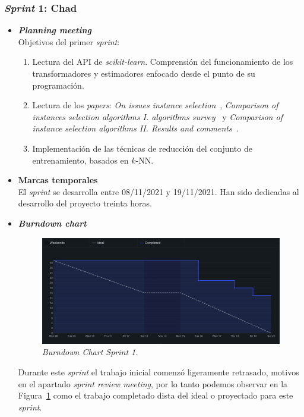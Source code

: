\subsubsection{\textit{Sprint} 1: Chad}
\begin{itemize}
\item \textbf{\textit{Planning meeting}}\\
Objetivos del primer \textit{sprint}:
\begin{enumerate}
\item Lectura del API de \textit{scikit-learn}. Comprensión del funcionamiento de los transformadores y estimadores enfocado desde el punto de su programación.
\item Lectura de los \textit{papers}: \textit{On issues instance selection}~\cite{liu2002issues}, \textit{Comparison of instances selection algorithms I. algorithms survey}~\cite{jankowski2004comparison} y \textit{Comparison of instance selection algorithms II. Results and comments}~\cite{grochowski2004comparison}.
\item Implementación de las técnicas de reducción del conjunto de entrenamiento, basados en $k$-NN.
\end{enumerate}

\item \textbf{Marcas temporales}\\
El \textit{sprint} se desarrolla entre 08/11/2021 y 19/11/2021. Han sido dedicadas al desarrollo del proyecto treinta horas.

\item \textbf{\textit{Burndown chart}}\\
\begin{figure}
\begin{center}
\includegraphics[width=\textwidth]{../img/anexos/sprints/BD-Sprint1}
\caption{\textit{Burndown Chart Sprint 1.}}\label{fig:BD-Sprint1}
\end{center}
\end{figure}
Durante este \textit{sprint} el trabajo inicial comenzó ligeramente retrasado, motivos en el apartado \textit{sprint review meeting}, por lo tanto podemos observar en la Figura~\ref{fig:BD-Sprint1} como el trabajo completado dista del ideal o proyectado para este \textit{sprint}.


\end{itemize}
